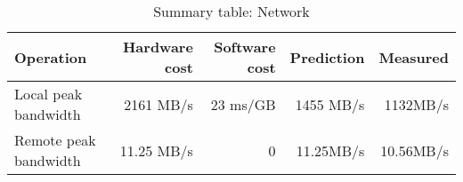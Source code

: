 \begin{table}[h]
\begin{center}
\begin{tabular}{| l | r | r | r | r |} \hline
Operation 			& Hardware cost 	& Software cost 	& Prediction	& Measured \\ \hline

Local peak bandwidth	&  2161 MB/s	& 23 ms/GB	&  1455 MB/s &  1132MB/s \\
\hline
Remote peak bandwidth 	&  11.25 MB/s	& 0 &  11.25MB/s	&  10.56MB/s \\
\hline\hline







\end{tabular}
\end{center}

\caption{Summary table: Network}

\end{table}












